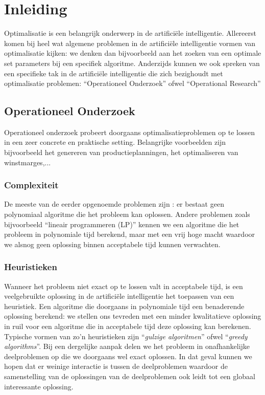 \chapter{Inleiding}
\label{inleiding}



Optimalisatie is een belangrijk onderwerp in de artifici\"ele intelligentie. Allereerst komen bij heel wat algemene problemen in de artifici\"ele intelligentie vormen van optimalisatie kijken: we denken dan bijvoorbeeld aan het zoeken van een optimale set parameters bij een specifiek algoritme. Anderzijds kunnen we ook spreken van een specifieke tak in de artifici\"ele intelligentie die zich bezighoudt met optimalisatie problemen: ``Operationeel Onderzoek'' ofwel ``Operational Research''

\section{Operationeel Onderzoek}

Operationeel onderzoek probeert doorgaans optimalisatieproblemen op te lossen in een zeer concrete en praktische setting. Belangrijke voorbeelden zijn bijvoorbeeld het genereren van productieplanningen, het optimaliseren van winstmarges,...

\subsection{Complexiteit}

De meeste van de eerder opgenoemde problemen zijn : er bestaat geen polynomiaal algoritme die het probleem kan oplossen. Andere problemen zoals bijvoorbeeld ``lineair programmeren (LP)'' kennen we een algoritme die het probleem in polynomiale tijd berekend, maar met een vrij hoge macht waardoor we alsnog geen oplossing binnen acceptabele tijd kunnen verwachten.

\subsection{Heuristieken}

Wanneer het probleem niet exact op te lossen valt in acceptabele tijd, is een veelgebruikte oplossing in de artifici\"ele intelligentie het toepassen van een heuristiek. Een algoritme die doorgaans in polynomiale tijd een benaderende oplossing berekend: we stellen ons tevreden met een minder kwalitatieve oplossing in ruil voor een algoritme die in acceptabele tijd deze oplossing kan berekenen. Typische vormen van zo'n heuristieken zijn ``\emph{gulzige algoritmen}'' ofwel ``\emph{greedy algorithms}''. Bij een dergelijke aanpak delen we het probleem in onafhankelijke deelproblemen op die we doorgaans wel exact oplossen. In dat geval kunnen we hopen dat er weinige interactie is tussen de deelproblemen waardoor de samenstelling van de oplossingen van de deelproblemen ook leidt tot een globaal interessante oplossing.

